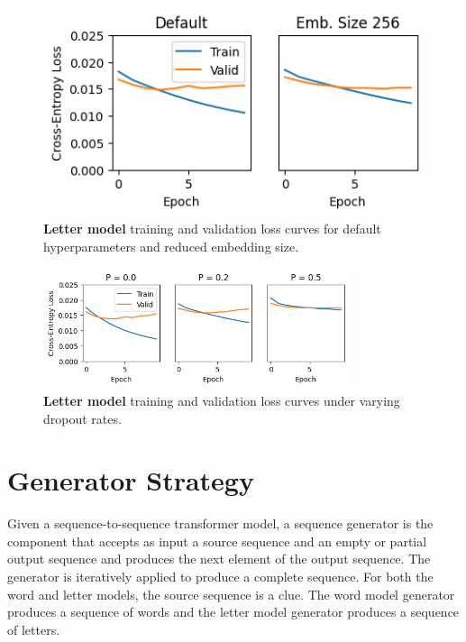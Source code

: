 \documentclass[letterpaper]{article} %
\begin{document}
\begin{NoHyper}
\begin{figure}
\centering
\includegraphics[width=0.9\columnwidth]{fig-charmark-loss-default-and-embsize}
\caption{\textbf{Letter model} training and validation loss curves for default hyperparameters and reduced embedding size.}
\label{fig:charmark-loss-df}
\end{figure}

\begin{figure}
\centering
\includegraphics[width=0.8\textwidth]{fig-charmark-loss-dropout}
\caption{\textbf{Letter model} training and validation loss curves under varying dropout rates.}
\label{fig:charmark-loss-dropout}
\end{figure}



\section{Generator Strategy}
\label{sec:generator}

Given a sequence-to-sequence transformer model, a sequence generator is the component that accepts as input a source sequence and an empty or partial output sequence and produces the next element of the output sequence. The generator is iteratively applied to produce a complete sequence. For both the word and letter models, the source sequence is a clue. The word model generator produces a sequence of words and the letter model generator produces a sequence of letters.


\end{NoHyper}
\end{document}
